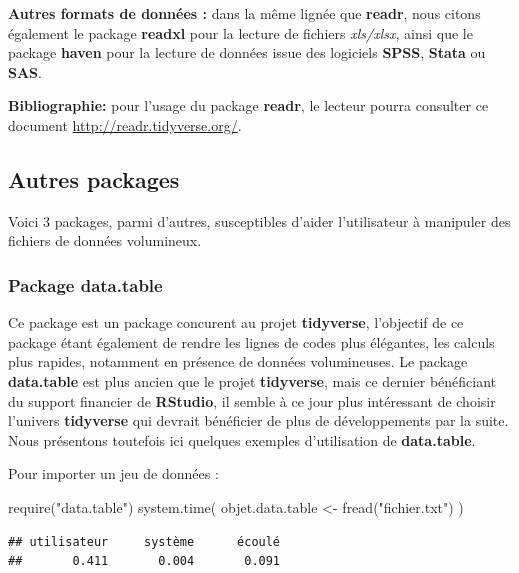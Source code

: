 \documentclass[
]{book}
\newenvironment{Shaded}{\begin{snugshade}}{\end{snugshade}}
\newcommand{\FunctionTok}[1]{\textcolor[rgb]{0.00,0.00,0.00}{#1}}
\newcommand{\NormalTok}[1]{#1}
\newcommand{\OtherTok}[1]{\textcolor[rgb]{0.56,0.35,0.01}{#1}}
\newcommand{\StringTok}[1]{\textcolor[rgb]{0.31,0.60,0.02}{#1}}
\theoremstyle{definition}
\theoremstyle{definition}
\theoremstyle{definition}
\theoremstyle{definition}
\theoremstyle{remark}
\begin{document}
\textbf{Autres formats de données :} dans la même lignée que \textbf{readr}, nous citons également le package \textbf{readxl} pour la lecture de fichiers \emph{xls/xlsx}, ainsi que le package \textbf{haven} pour la lecture de données issue des logiciels \textbf{SPSS}, \textbf{Stata} ou \textbf{SAS}.

\textbf{Bibliographie:} pour l'usage du package \textbf{readr}, le lecteur pourra consulter ce document \url{http://readr.tidyverse.org/}.

\hypertarget{autres-packages}{%
\subsection{Autres packages}\label{autres-packages}}

Voici 3 packages, parmi d'autres, susceptibles d'aider l'utilisateur à manipuler des fichiers de données volumineux.

\hypertarget{package-data.table}{%
\subsubsection{\texorpdfstring{Package \textbf{data.table}}{Package data.table}}\label{package-data.table}}

Ce package est un package concurent au projet \textbf{tidyverse}, l'objectif de ce package étant également de rendre les lignes de codes plus élégantes, les calculs plus rapides, notamment en présence de données volumineuses. Le package \textbf{data.table} est plus ancien que le projet \textbf{tidyverse}, mais ce dernier bénéficiant du support financier de \textbf{RStudio}, il semble à ce jour plus intéressant de choisir l'univers \textbf{tidyverse} qui devrait bénéficier de plus de développements par la suite. Nous présentons toutefois ici quelques exemples d'utilisation de \textbf{data.table}.

Pour importer un jeu de données :

\begin{Shaded}
\begin{Highlighting}[]
\FunctionTok{require}\NormalTok{(}\StringTok{"data.table"}\NormalTok{)}
\FunctionTok{system.time}\NormalTok{(}
\NormalTok{objet.data.table }\OtherTok{\textless{}{-}} \FunctionTok{fread}\NormalTok{(}\StringTok{"fichier.txt"}\NormalTok{)}
\NormalTok{)}
\end{Highlighting}
\end{Shaded}

\begin{verbatim}
## utilisateur     système      écoulé 
##       0.411       0.004       0.091
\end{verbatim}
\end{document}
